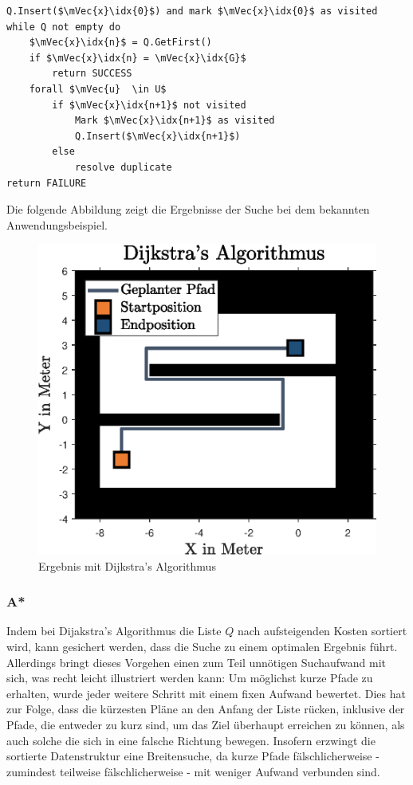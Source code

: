 \begin{lstlisting}[mathescape=true, caption={Dijkstra's Algorithmus in Pseudocode}]
Q.Insert($\mVec{x}\idx{0}$) and mark $\mVec{x}\idx{0}$ as visited
while Q not empty do
	$\mVec{x}\idx{n}$ = Q.GetFirst()
	if $\mVec{x}\idx{n} = \mVec{x}\idx{G}$
		return SUCCESS
	forall $\mVec{u}  \in U$
		if $\mVec{x}\idx{n+1}$ not visited
			Mark $\mVec{x}\idx{n+1}$ as visited
			Q.Insert($\mVec{x}\idx{n+1}$)
		else
			resolve duplicate
return FAILURE
\end{lstlisting}
Die folgende Abbildung zeigt die Ergebnisse der Suche bei dem bekannten Anwendungsbeispiel.
\begin{figure}[ht!]
\centering
\includegraphics[width=0.5\linewidth]{img/KorridorBeispiel_img6.eps}
\caption{Ergebnis mit Dijkstra's Algorithmus}
\end{figure}

\subsubsection{A*}
Indem bei Dijakstra's Algorithmus die Liste $Q$ nach aufsteigenden Kosten sortiert wird, kann gesichert werden, dass die Suche zu einem optimalen Ergebnis führt. Allerdings bringt dieses Vorgehen einen zum Teil unnötigen Suchaufwand mit sich, was recht leicht illustriert werden kann: Um möglichst kurze Pfade zu erhalten, wurde jeder weitere Schritt mit einem fixen Aufwand bewertet. Dies hat zur Folge, dass die kürzesten Pläne an den Anfang der Liste rücken, inklusive der Pfade, die entweder zu kurz sind, um das Ziel überhaupt erreichen zu können, als auch solche die sich in eine falsche Richtung bewegen. Insofern erzwingt die sortierte Datenstruktur eine Breitensuche, da kurze Pfade fälschlicherweise - zumindest teilweise fälschlicherweise - mit weniger Aufwand verbunden sind.

